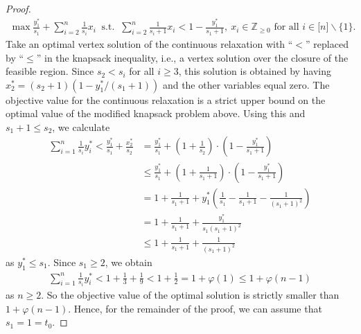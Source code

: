 \documentclass[pdflatex]{sn-jnl}
\newcommand{\Z}{\mathbb{Z}}
\theoremstyle{thmstyleone}%
\theoremstyle{thmstyletwo}%
\theoremstyle{thmstylethree}%
\begin{document}
\begin{proof}
		\begin{align*}
			\max \frac{y_1^*}{s_1} + \sum_{i=2}^n\frac{1}{s_i}x_i \ \text{ s.t. } \ \sum_{i = 2}^n \frac{1}{s_i + 1}x_i < 1 - \frac{y_1^*}{s_1 + 1}, \ x_i\in\Z_{\geq 0}  \text{ for all }i\in \lbrack n\rbrack\backslash \lbrace 1\rbrace.
		\end{align*}
		Take an optimal vertex solution of the continuous relaxation with ``$<$'' replaced by ``$\leq$'' in the knapsack inequality, i.e., a vertex solution over the closure of the feasible region. Since $s_2 < s_i$ for all $i\geq 3$, this solution is obtained by having $x^*_2 = (s_2 + 1)(1-y_1^*/(s_1 + 1))$ and the other variables equal zero. The objective value for the continuous relaxation is a strict upper bound on the optimal value of the modified knapsack problem above. Using this and $s_1 + 1\leq s_2$, we calculate
		\begin{align*}
			\sum_{i=1}^n \frac{1}{s_i}y^*_i < \frac{y_1^*}{s_1} + \frac{x^*_2}{s_2} & = \frac{y_1^*}{s_1} + \left(1 + \frac{1}{s_2}\right)\cdot \left(1 - \frac{y_1^*}{s_1 + 1}\right) \nonumber \\ 
			& \leq \frac{y_1^*}{s_1} + \left(1 + \frac{1}{s_1+ 1}\right)\cdot \left(1 - \frac{y_1^*}{s_1 + 1}\right) \nonumber \\
			& = 1 + \frac{1}{s_1+ 1} + y^*_1 \left(\frac{1}{s_1} - \frac{1}{s_1 + 1} - \frac{1}{(s_1 + 1)^2}\right) \nonumber \\ 
			& = 1 + \frac{1}{s_1+ 1} + \frac{y_1^*}{s_1(s_1 + 1)^2} \\ 
			& \leq 1 + \frac{1}{s_1 + 1} + \frac{1}{(s_1 + 1)^2}
		\end{align*}
		as $y_1^*\leq s_1$. 
		Since $s_1 \geq 2$, we obtain 
		\begin{align*}
			\sum_{i=1}^n \frac{1}{s_i}y^*_i < 1 + \frac{1}{3} + \frac{1}{9} < 1 + \frac{1}{2} = 1 + \varphi(1) \leq 1 + \varphi(n-1)
		\end{align*}
		as $n\geq 2$. So the objective value of the optimal solution is strictly smaller than $1 + \varphi(n-1)$. Hence, for the remainder of the proof, we can assume that $s_1 = 1 = t_0$. 
		

\end{proof}
\end{document}
